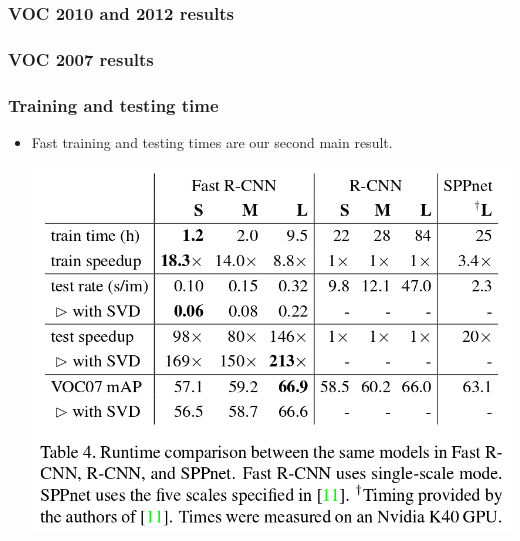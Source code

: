 \documentclass[11pt]{article}
\begin{document}
\subsubsection{VOC 2010 and 2012 results}
\label{sec-1-3-2}

    
\subsubsection{VOC 2007 results}
\label{sec-1-3-3}
\subsubsection{Training and testing time}
\label{sec-1-3-4}


\begin{itemize}
\item Fast training  and testing times are our second main result.

      \includegraphics[width=.9\linewidth]{./pic_fast_rcnn/table4.png}
\end{itemize}
\end{document}
